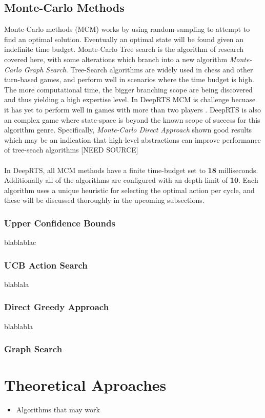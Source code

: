 \documentclass[fleqn,10pt]{article} %
\begin{document}
\subsection{Monte-Carlo Methods}
Monte-Carlo methods (MCM) works by using random-sampling to attempt to find an optimal solution. Eventually an optimal state will be found given an indefinite time budget. Monte-Carlo Tree search is the algorithm of research covered here, with some alterations which branch into a new algorithm \textit{Monte-Carlo Graph Search}.
Tree-Search algorithms are widely used in chess and other turn-based games, and perform well in scenarios where the time budget is high. The more computational time, the bigger branching scope are being discovered and thus yielding a high expertise level.
In DeepRTS MCM is challenge becuase it has yet to perform well in games with more than two players . DeepRTS is also an complex game where state-space is beyond the known scope of success for this algorithm genre. Specifically, \textit{Monte-Carlo Direct Approach} shown good results which may be an indication that high-level abstractions can improve performance of tree-seach algorithms [NEED SOURCE]
\\
\\
In DeepRTS, all MCM methods have a finite time-budget set to \textbf{18} milliseconds. Additionally all of the algorithms are configured with an depth-limit of \textbf{10}. 
Each algorithm uses a unique heuristic for selecting the optimal action per cycle, and these will be discussed thoroughly in the upcoming subsections.
\subsubsection*{Upper Confidence Bounds}
blablablac

\subsubsection*{UCB Action Search}
blablala

\subsubsection*{Direct Greedy Approach}
blablabla

\subsubsection*{Graph Search}

\section{Theoretical Aproaches}
\begin{itemize}
    \item Algorithms that may work
\end{itemize}
\end{document}
